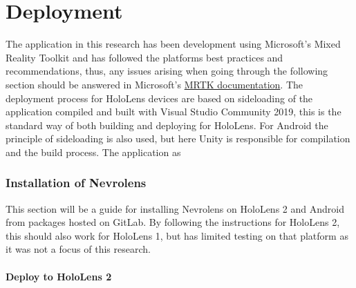 \chapter{Deployment}

The application in this research has been development using Microsoft's Mixed Reality Toolkit and has followed the platforms best practices and recommendations, thus, any issues arising when going through the following section should be answered in Microsoft's \href{https://docs.microsoft.com/en-us/windows/mixed-reality/mrtk-unity}{MRTK documentation}. The deployment process for HoloLens devices are based on sideloading of the application compiled and built with Visual Studio Community 2019, this is the standard way of both building and deploying for HoloLens. For Android the principle of sideloading is also used, but here Unity is responsible for compilation and the build process. 
The application as 


\subsection*{Installation of Nevrolens}

This section will be a guide for installing Nevrolens on HoloLens 2 and Android from packages hosted on GitLab.
By following the instructions for HoloLens 2, this should also work for HoloLens 1, but has limited testing on that platform as it was not a focus of this research.

\subsubsection*{Deploy to HoloLens 2}

